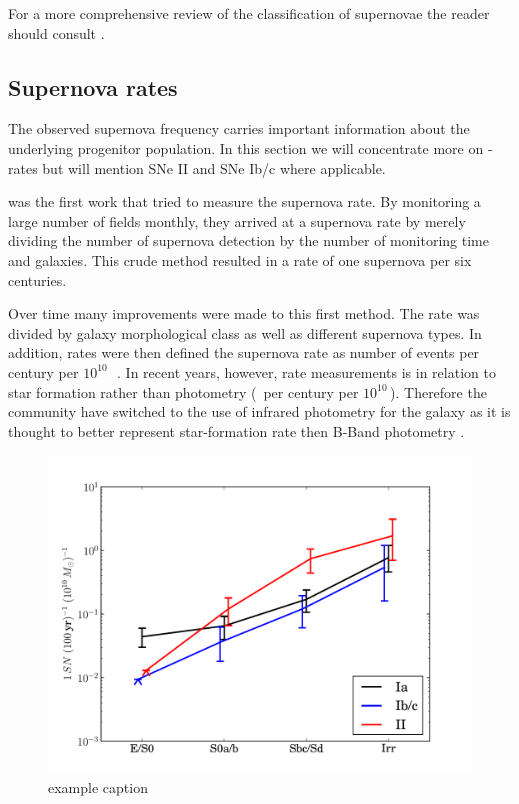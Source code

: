 For a more comprehensive review of the classification of supernovae the reader should consult \citet{2003LNP...598...21T, 2007AIPC..937..187T}.

\subsection{Supernova rates} 
The observed supernova frequency carries important information about the underlying progenitor population. In this section we will concentrate more on \sneia-rates but will mention SNe II and SNe Ib/c where applicable.

\citet{1938ApJ....88..529Z} was the first work that tried to measure the supernova rate. By monitoring a large number of fields monthly, they arrived at a supernova rate by merely dividing the number of supernova detection by the number of monitoring time and galaxies. This crude method resulted in a rate of one supernova per six centuries. 

Over time many improvements were made to this first method. The rate was divided by galaxy morphological class as well as different supernova types. In addition, rates were then defined the supernova rate as number of events per century per $10^{10}$\,\lsun\ \citep[e.g.][]{1991ARA&A..29..363V,1994ApJS...92..487T}. In recent years, however, rate measurements is in relation to star formation rather than photometry (\sn\ per century per $10^{10}$\,\msun).  Therefore the community \citep[e.g.][]{2005A&A...433..807M} have switched to the use of infrared photometry for the galaxy as it is thought to better represent star-formation rate then B-Band photometry \citep{2003A&A...410...83H}. 
\begin{figure}[htbp] %
   \centering
   \includegraphics[width=\textwidth]{chapter_intro/plots/snrates_mannucci05.pdf} 
   \caption{example caption}
   \label{fig:snrates_mannucci05}
\end{figure}

